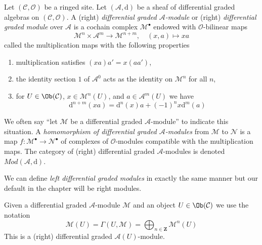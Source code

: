 \begin{definition}
\label{definition-dgm}
Let $(\mathcal{C}, \mathcal{O})$ be a ringed site.
Let $(\mathcal{A}, \text{d})$ be a sheaf of differential graded algebras
on $(\mathcal{C}, \mathcal{O})$.
A (right) {\it differential graded $\mathcal{A}$-module} or (right)
{\it differential graded module} over $\mathcal{A}$
is a cochain complex $\mathcal{M}^\bullet$ endowed with
$\mathcal{O}$-bilinear maps
$$
\mathcal{M}^n \times \mathcal{A}^m \to \mathcal{M}^{n + m},\quad
(x, a) \longmapsto xa
$$
called the multiplication maps with the following properties
\begin{enumerate}
\item multiplication satisfies $(xa)a' = x(aa')$,
\item the identity section $1$ of $\mathcal{A}^0$
acts as the identity on $\mathcal{M}^n$ for all $n$,
\item for $U \in \Ob(\mathcal{C})$, $x \in \mathcal{M}^n(U)$, and
$a \in \mathcal{A}^m(U)$ we have
$$
\text{d}^{n + m}(xa) = \text{d}^n(x)a + (-1)^n x\text{d}^m(a)
$$
\end{enumerate}
We often say ``let $\mathcal{M}$ be a differential graded
$\mathcal{A}$-module'' to indicate this situation.
A {\it homomorphism of differential graded $\mathcal{A}$-modules}
from $\mathcal{M}$ to $\mathcal{N}$ is a map
$f : \mathcal{M}^\bullet \to \mathcal{N}^\bullet$ of complexes
of $\mathcal{O}$-modules compatible with the multiplication maps.
The category of (right) differential graded $\mathcal{A}$-modules
is denoted $\textit{Mod}(\mathcal{A}, \text{d})$.
\end{definition}

\noindent
We can define {\it left differential graded modules} in exactly the same manner
but our default in the chapter will be right modules.

\medskip\noindent
Given a differential graded $\mathcal{A}$-module $\mathcal{M}$
and an object $U \in \Ob(\mathcal{C})$ we use the notation
$$
\mathcal{M}(U) =
\Gamma(U, \mathcal{M}) =
\bigoplus\nolimits_{n \in \mathbf{Z}} \mathcal{M}^n(U)
$$
This is a (right) differential graded $\mathcal{A}(U)$-module.

